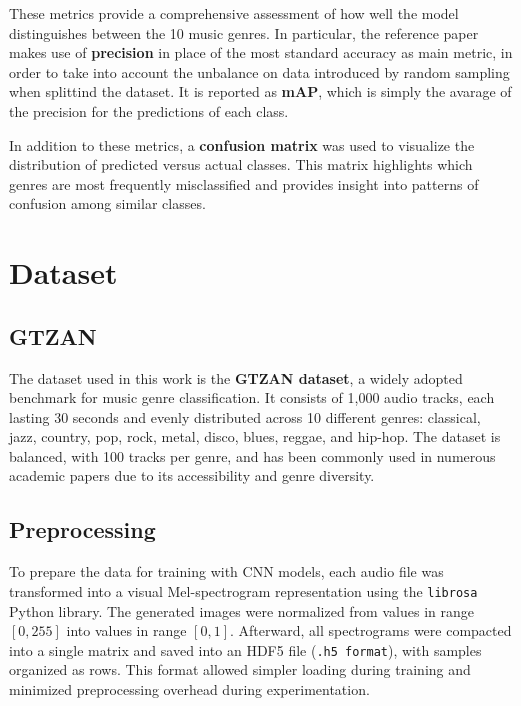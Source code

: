 \documentclass[a4paper,12pt]{article}
\begin{document}
These metrics provide a comprehensive assessment of how well the model distinguishes between the 10 music genres. In particular, the reference paper makes use of \textbf{precision} in place of the most standard accuracy as main metric, in order to take into account the unbalance on data introduced by random sampling when splittind the dataset. It is reported as \textbf{mAP}, which is simply the avarage of the precision for the predictions of each class.

In addition to these metrics, a \textbf{confusion matrix} was used to visualize the distribution of predicted versus actual classes. This matrix highlights which genres are most frequently misclassified and provides insight into patterns of confusion among similar classes.






\section{Dataset}

\subsection{GTZAN}
The dataset used in this work is the \textbf{GTZAN dataset}, a widely adopted benchmark for music genre classification. It consists of 1,000 audio tracks, each lasting 30 seconds and evenly distributed across 10 different genres: classical, jazz, country, pop, rock, metal, disco, blues, reggae, and hip-hop. The dataset is balanced, with 100 tracks per genre, and has been commonly used in numerous academic papers due to its accessibility and genre diversity.

\subsection{Preprocessing}
To prepare the data for training with CNN models, each audio file was transformed into a visual Mel-spectrogram representation using the \texttt{librosa} Python library. The generated images were normalized from values in range $[0,255]$ into values in range $[0,1]$. Afterward, all spectrograms were compacted into a single matrix and saved into an HDF5 file (\texttt{.h5 format}), with samples organized as rows. This format allowed simpler loading during training and minimized preprocessing overhead during experimentation.
\end{document}
